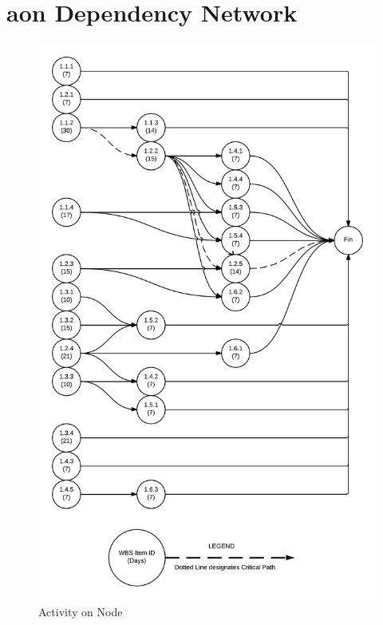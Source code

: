 \section{\gls{aon} Dependency Network}
\begin{figure}[H]
\centering
\includegraphics[width=.75\textwidth]{AON.png}
\caption{Activity on Node}
\label{fig:Activity on Node}
\end{figure}

